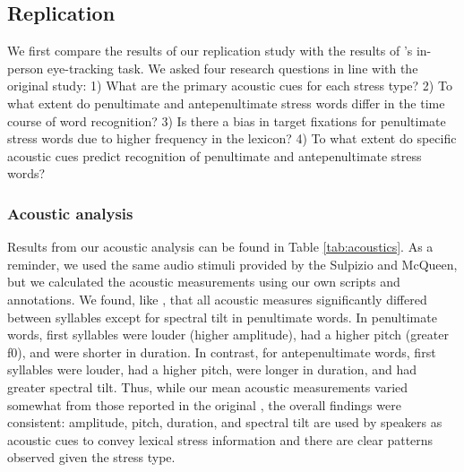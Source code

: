 \subsection{Replication}

We first compare the results of our replication study with the results of \cite{Sulpizio_McQueen_2012}'s in-person eye-tracking task. We asked four research questions in line with the original study: 1) What are the primary acoustic cues for each stress type? 2) To what extent do penultimate and antepenultimate stress words differ in the time course of word recognition? 3) Is there a bias in target fixations for penultimate stress words due to higher frequency in the lexicon? 4) To what extent do specific acoustic cues predict recognition of penultimate and antepenultimate stress words?  

\subsubsection{Acoustic analysis}
Results from our acoustic analysis can be found in Table \ref{tab:acoustics}. As a reminder, we used the same audio stimuli provided by the Sulpizio and McQueen, but we calculated the acoustic measurements using our own scripts and annotations. We found, like \cite{Sulpizio_McQueen_2012}, that all acoustic measures significantly differed between syllables except for spectral tilt in penultimate words. In penultimate words, first syllables were louder (higher amplitude), had a higher pitch (greater f0), and were shorter in duration. In contrast, for antepenultimate words, first syllables were louder, had a higher pitch, were longer in duration, and had greater spectral tilt. Thus, while our mean acoustic measurements varied somewhat from those reported in the original \cite{Sulpizio_McQueen_2012}, the overall findings were consistent: amplitude, pitch, duration, and spectral tilt are used by speakers as acoustic cues to convey lexical stress information and there are clear patterns observed given the stress type. 



